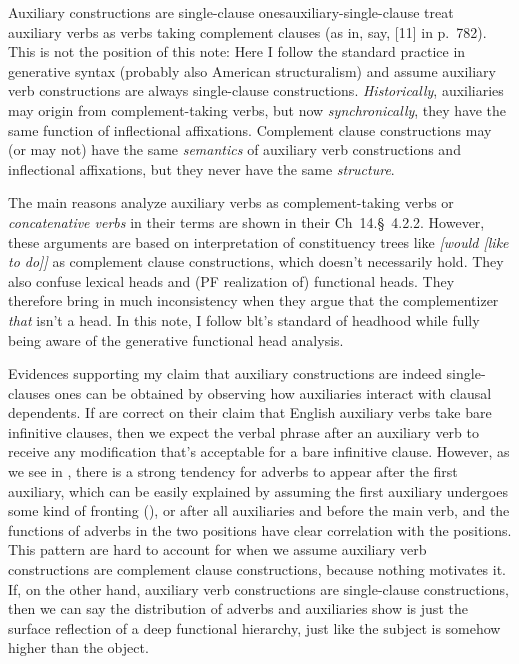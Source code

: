 \documentclass[UTF8, a4paper, oneside, scheme=plain]{ctexrep}
\newcommand*{\citesec}[1]{\S~{#1}}
\newcommand*{\citechap}[1]{Ch~{#1}}
\newcommand*{\citepage}[1]{p.~{#1}}
\newcommand*{\citechapsec}[2]{\citechap{#1}.\citesec{#2}}
\newcommand*{\term}[1]{\emph{#1}}
\newcommand{\corpus}[1]{\emph{#1}}
\begin{document}
\begin{infobox}{Auxiliary constructions are single-clause ones}{auxiliary-single-clause}
    \citet{cgel} treat auxiliary verbs as verbs taking complement clauses 
    (as in, say, [11] in \citepage{782}).
    This is not the position of this note:
    Here I follow the standard practice in generative syntax (probably also American structuralism) 
    and assume auxiliary verb constructions are always single-clause constructions.
    \emph{Historically}, auxiliaries may origin from complement-taking verbs,
    but now \emph{synchronically}, they have the same function of inflectional affixations.
    Complement clause constructions may (or may not) have the same \emph{semantics} of 
    auxiliary verb constructions and inflectional affixations,
    but they never have the same \emph{structure}.

    The main reasons \citet{cgel} analyze auxiliary verbs as complement-taking verbs or
    \term{concatenative verbs} in their terms 
    are shown in their \citechapsec{14}{4.2.2}.
    However, these arguments are based on interpretation of constituency trees like
    \corpus{[would [like to do]]} as complement clause constructions,
    which doesn't necessarily hold.
    They also confuse lexical heads and (PF realization of) functional heads.
    They therefore bring in much inconsistency when they argue that 
    the complementizer \corpus{that} isn't a head.
    In this note, I follow \acs{blt}'s standard of headhood
    while fully being aware of the generative functional head analysis.

    Evidences supporting my claim that auxiliary constructions are indeed single-clauses ones 
    can be obtained by observing how auxiliaries interact with clausal dependents.
    If \citet{cgel} are correct on their claim that English auxiliary verbs take bare infinitive clauses,
    then we expect the verbal phrase after an auxiliary verb to receive any modification 
    that's acceptable for a bare infinitive clause.
    However, as we see in ,
    there is a strong tendency for adverbs to appear after the first auxiliary,
    which can be easily explained by assuming the first auxiliary 
    undergoes some kind of fronting (),
    or after all auxiliaries and before the main verb,
    and the functions of adverbs in the two positions 
    have clear correlation with the positions.
    This pattern are hard to account for 
    when we assume auxiliary verb constructions are complement clause constructions,
    because nothing motivates it.
    If, on the other hand, 
    auxiliary verb constructions are single-clause constructions,
    then we can say the distribution of adverbs and auxiliaries
    show is just the surface reflection of a deep functional hierarchy,
    just like the subject is somehow higher than the object.
\end{infobox}
\end{document}
